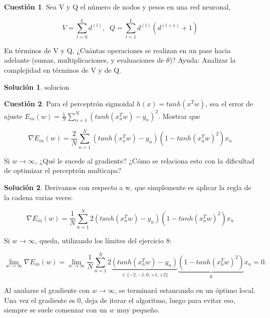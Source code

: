 \documentclass[a4paper, 11pt]{article}
\theoremstyle{definition}
\newtheorem{cuestion}{Cuestión}
\newtheorem*{solucion}{Solución}
\begin{document}
  \begin{cuestion}
    Sea V y Q el número de nodos y pesos en una red neuronal,

    $$ V = \sum_{l=0}^L d^{(l)}, \; \; Q = \sum_{l=1}^L d^{(l)} \left( d^{(l+1)} + 1\right) $$

    En términos de V y Q, ¿Cuántas operaciones se realizan en un pase hacia adelante (sumas, multiplicaciones, y evaluaciones de $\theta$)? Ayuda: Analizar la complejidad en términos de V y de Q.



  \end{cuestion}

  \begin{solucion}
    solucion
  \end{solucion}

  \begin{cuestion}
    Para el perceptrón sigmoidal $h(x) = tanh(x^Tw)$, sea el error de ajuste $E_{in}(w) = \frac{1}{N}\sum_{n=1}^N \left( tanh(x_n^Tw) - y_n \right)^2$. Mostrar que

    $$ \nabla E_{in}(w) = \frac{2}{N} \sum_{n=1}^N \left( tanh(x_n^Tw) - y_n \right) \left( 1 - tanh(x_n^Tw)^2 \right) x_n $$

    Si $w \rightarrow \infty$, ¿Qué le sucede al gradiente? ¿Cómo se relaciona esto con la dificultad de optimizar el perceptrón multicapa?

  \end{cuestion}

  \begin{solucion}
    Derivamos con respecto a w, que simplemente es aplicar la regla de la cadena varias veces:

    \[
    \nabla E_{in}(w) = \frac{1}{N} \sum_{n=1}^N 2 \left( tanh(x_n^Tw) - y_n \right) \left( 1 - tanh(x_n^Tw)^2 \right) x_n
    \]

    Si $w \rightarrow \infty$, queda, utilizando los límites del ejercicio 8:

    \[
    \lim_{w \rightarrow \infty}\nabla E_{in}(w) =  \lim_{w \rightarrow \infty}\frac{1}{N} \sum_{n=1}^N 2 \underbrace{\left( tanh(x_n^Tw) - y_n \right)}_{\in \{-2,-1,0,+1,+2\}} \underbrace{\left( 1 - tanh(x_n^Tw)^2 \right)}_{0} x_n = 0.
    \]

    Al anularse el gradiente con $w \rightarrow \infty$, se terminará estancando en un óptimo local. Una vez el gradiente es 0, deja de iterar el algoritmo, luego para evitar eso, siempre se suele comenzar con un $w$ muy pequeño.
  \end{solucion}
\end{document}
